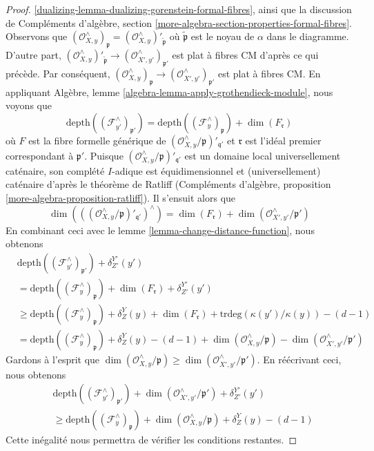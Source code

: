 \begin{proof}
\ref{dualizing-lemma-dualizing-gorenstein-formal-fibres},
ainsi que la discussion de Compléments d'algèbre, section
\ref{more-algebra-section-properties-formal-fibres}.
Observons que $(\mathcal{O}_{X, y}^\wedge)_\mathfrak p =
(\mathcal{O}_{X, y}^\wedge)'_{\tilde{\mathfrak p}}$
où $\tilde{\mathfrak p}$ est le noyau de $\alpha$
dans le diagramme. D'autre part,
$(\mathcal{O}_{X, y}^\wedge)'_{\tilde{\mathfrak p}}
\to (\mathcal{O}_{X', y'}^\wedge)_{\mathfrak p'}$
est plat à fibres CM d'après ce qui précède. Par conséquent,
$(\mathcal{O}_{X, y}^\wedge)_\mathfrak p  \to
(\mathcal{O}_{X', y'}^\wedge)_{\mathfrak p'}$ est plat à fibres CM.
En appliquant Algèbre, lemme \ref{algebra-lemma-apply-grothendieck-module},
nous voyons que
$$
\text{depth}((\mathcal{F}_{y'}^\wedge)_{\mathfrak p'}) =
\text{depth}((\mathcal{F}_y^\wedge)_{\mathfrak p}) +
\dim(F_\mathfrak r)
$$
où $F$ est la fibre formelle générique de
$(\mathcal{O}_{X, y}^\wedge/\mathfrak p)'_{\mathfrak q'}$
et $\mathfrak r$ est l'idéal premier correspondant à $\mathfrak p'$.
Puisque $(\mathcal{O}_{X, y}^\wedge/\mathfrak p)'_{\mathfrak q'}$
est un domaine local universellement caténaire, son complété $I$-adique
est équidimensionnel et (universellement) caténaire d'après le théorème de Ratliff
(Compléments d'algèbre, proposition \ref{more-algebra-proposition-ratliff}).
Il s'ensuit alors que
$$
\dim(((\mathcal{O}_{X, y}^\wedge/\mathfrak p)'_{\mathfrak q'})^\wedge) =
\dim(F_\mathfrak r) + \dim(\mathcal{O}_{X', y'}^\wedge/\mathfrak p')
$$
En combinant ceci avec le lemme \ref{lemma-change-distance-function},
nous obtenons
\begin{equation}
\label{equation-one}
\begin{aligned}
&
\text{depth}((\mathcal{F}_{y'}^\wedge)_{\mathfrak p'}) +
\delta^{Y'}_{Z'}(y') \\
& =
\text{depth}((\mathcal{F}_y^\wedge)_{\mathfrak p}) +
\dim(F_\mathfrak r) + \delta^{Y'}_{Z'}(y') \\
& \geq
\text{depth}((\mathcal{F}_y^\wedge)_{\mathfrak p}) + \delta^Y_Z(y) +
\dim(F_\mathfrak r) + \text{trdeg}(\kappa(y')/\kappa(y)) - (d - 1) \\
& =
\text{depth}((\mathcal{F}_y^\wedge)_{\mathfrak p}) + \delta^Y_Z(y) - (d - 1)
+ \dim(\mathcal{O}_{X, y}^\wedge/\mathfrak p) -
\dim(\mathcal{O}_{X', y'}^\wedge/\mathfrak p')
\end{aligned}
\end{equation}
Gardons à l'esprit que
$\dim(\mathcal{O}_{X, y}^\wedge/\mathfrak p) \geq
\dim(\mathcal{O}_{X', y'}^\wedge/\mathfrak p')$. En réécrivant ceci, nous obtenons
\begin{equation}
\label{equation-two}
\begin{aligned}
&
\text{depth}((\mathcal{F}_{y'}^\wedge)_{\mathfrak p'}) +
\dim(\mathcal{O}_{X', y'}^\wedge/\mathfrak p') +
\delta^{Y'}_{Z'}(y') \\
& \geq
\text{depth}((\mathcal{F}_y^\wedge)_{\mathfrak p}) +
\dim(\mathcal{O}_{X, y}^\wedge/\mathfrak p) +
\delta^Y_Z(y) - (d - 1)
\end{aligned}
\end{equation}
Cette inégalité nous permettra de vérifier les conditions restantes.


\end{proof}
